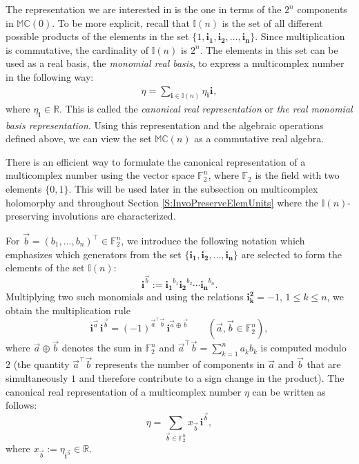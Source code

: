 \documentclass[12pt]{amsart}
\theoremstyle{plain}
\theoremstyle{definition}
\numberwithin{equation}{section}
\newcommand{\im}[1]{\mathbf{ i_{#1}}}
\newcommand{\ims}[1]{\mathbf{ i_{#1}^2}}
\newcommand{\mC}{\mathbb{C}}
\newcommand{\mR}{\mathbb{R}}
\newcommand{\mM}{\mathbb{M}}
\newcommand{\mI}{\mathbb{I}}
\begin{document}
    The representation we are interested in is the one in terms of the $2^n$ components in $\mM \mC(0)$. To be more explicit, recall that $\mI(n)$ is the set of all different possible products of the elements in the set $\{ 1 , \im{1} , \im{2} , \ldots , \im{n} \}$. Since multiplication is commutative, the cardinality of $\mI(n)$ is $2^{n}$. The elements in this set can be used as a real basis, the \emph{monomial real basis}, to express a multicomplex number in the following way: 
    \begin{align}
        \eta = \sum_{\im{} \in \mI(n)} \eta_{\im{}} \im{}, \label{Eq:CanoFormMC}
        \end{align}
    where $\eta_{\im{}} \in \mR$. This is called the \emph{canonical real representation} or \emph{the real monomial basis representation}. Using this representation and the algebraic operations defined above, we can view the set $\mM \mC(n )$ as a commutative real algebra. 

    There is an efficient way to formulate the canonical representation of a multicomplex number using the vector space $\mathbb{F}_2^n$, where $\mathbb F_2$ is the field with two elements $\{ 0, 1 \}$. This will be used later in the subsection on multicomplex holomorphy and throughout Section \ref{S:InvoPreserveElemUnits} where the $\mI (n)$-preserving involutions are characterized. 
    
    For $\vec b=(b_1,\ldots,b_n)^\top\in\mathbb F_2^n$, we introduce the following notation which emphasizes which generators from the set $\{ \im{1} , \im{2} , \ldots , \im{n} \}$ are selected to form the elements of the set $\mI (n)$: 
\[
\mathbf i^{\vec b}:=\im{1}^{b_1}\im{2}^{b_2}\cdots \im{n}^{b_n}.
\]
Multiplying two such monomials and using the relations $\ims{k}=-1$, $1 \leq k \leq n$, we obtain the multiplication rule
\begin{equation}\label{Eq:MonomialMult}
\mathbf i^{\vec a}\,\mathbf i^{\vec b}=(-1)^{\vec a^{\top} \vec b}\,\mathbf i^{\vec a\oplus\vec b}
\qquad (\vec a,\vec b\in\mathbb F_2^n),
\end{equation}
where $\vec a\oplus\vec b$ denotes the sum in $\mathbb F_2^n$ and $\vec a^{\top}\vec b=\sum_{k=1}^n a_k b_k$ is computed modulo $2$ (the quantity $\vec{a}^\top \vec{b}$ represents the number of components in $\vec{a}$ and $\vec{b}$ that are simultaneously $1$ and therefore contribute to a sign change in the product). The canonical real representation of a multicomplex number $\eta$ can be written as follows: 
\begin{equation}\label{Eq:CartesianMonomialF2n}
    \eta = \sum_{\vec b \in \mathbb F_2^n} x_{\vec b}\, \mathbf i^{\vec b},
\end{equation}
where $x_{\vec b} := \eta_{\mathbf i^{\vec b}} \in \mR$. 
\end{document}
